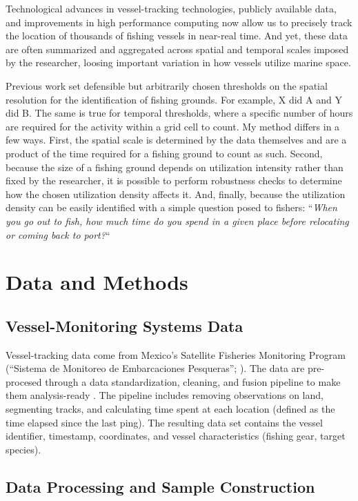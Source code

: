 \documentclass[12pt]{article}
\begin{document}
Technological advances in vessel-tracking technologies, publicly available data, and improvements in high performance computing now allow us to precisely track the location of thousands of fishing vessels in near-real time. And yet, these data are often summarized and aggregated across spatial and temporal scales imposed by the researcher, loosing important variation in how vessels utilize marine space. 

Previous work set defensible but arbitrarily chosen thresholds on the spatial resolution for the identification of fishing grounds. For example, X did A and Y did B. The same is true for temporal thresholds, where a specific number of hours are required for the activity within a grid cell to count. My method differs in a few ways. First, the spatial scale is determined by the data themselves and are a product of the time required for a fishing ground to count as such. Second, because the size of a fishing ground depends on utilization intensity rather than fixed by the researcher, it is possible to perform robustness checks to determine how the chosen utilization density affects it. And, finally, because the utilization density can be easily identified with a simple question posed to fishers: ``\textit{When you go out to fish, how much time do you spend in a given place before relocating or coming back to port?}``

\section{Data and Methods}

\subsection{Vessel-Monitoring Systems Data}

Vessel-tracking data come from Mexico's Satellite Fisheries Monitoring Program (``Sistema de Monitoreo de Embarcaciones Pesqueras''; \citet{sismep}). The data are pre-procesed through a data standardization, cleaning, and fusion pipeline to make them analysis-ready \citep{Villasenor-Derbez2026-ae}. The pipeline includes removing observations on land, segmenting tracks, and calculating time spent at each location (defined as the time elapsed since the last ping). The resulting data set contains the vessel identifier, timestamp, coordinates, and vessel characteristics (fishing gear, target species).

\FloatBarrier
\subsection{Data Processing and Sample Construction}
\end{document}
